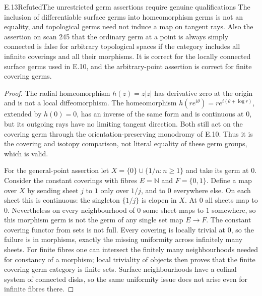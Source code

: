 \begin{statement}{E.13}{Refuted}{The unrestricted germ assertions require genuine qualifications}
The inclusion of differentiable surface germs into homeomorphism
germs is not an equality, and topological germs need not induce a
map on tangent rays.  Also the assertion on scan 245 that the
ordinary germ at a point is always simply connected is false for
arbitrary topological spaces if the category includes all infinite
coverings and all their morphisms.  It is correct for the locally
connected surface germs used in E.10, and the arbitrary-point
assertion is correct for finite covering germs.
\end{statement}
\begin{proof}
The radial homeomorphism $h(z)=z|z|$ has derivative zero at the
origin and is not a local diffeomorphism.  The homeomorphism
$h(re^{i\theta})=re^{i(\theta+\log r)}$, extended by $h(0)=0$,
has an inverse of the same form and is continuous at $0$, but
its outgoing rays have no limiting tangent direction.  Both still
act on the covering germ through the orientation-preserving
monodromy of E.10.  Thus it is the covering and isotopy comparison,
not literal equality of these germ groups, which is valid.

For the general-point assertion let
$X=\{0\}\cup\{1/n:n\geq1\}$ and take its germ at $0$.
Consider the constant coverings with fibres $E=\mathbb N$ and
$F=\{0,1\}$.  Define a map over $X$ by sending sheet $j$ to $1$
only over $1/j$, and to $0$ everywhere else.  On each sheet this
is continuous: the singleton $\{1/j\}$ is clopen in $X$.
At $0$ all sheets map to $0$.  Nevertheless on every neighbourhood
of $0$ some sheet maps to $1$ somewhere, so this morphism germ
is not the germ of any single set map $E\to F$.  The constant
covering functor from sets is not full.  Every covering is locally
trivial at $0$, so the failure is in morphisms, exactly the missing
uniformity across infinitely many sheets.  For finite fibres
one can intersect the finitely many neighbourhoods needed for
constancy of a morphism; local triviality of objects then proves
that the finite covering germ category is finite sets.  Surface
neighbourhoods have a cofinal system of connected disks, so the
same uniformity issue does not arise even for infinite fibres there.
\end{proof}
